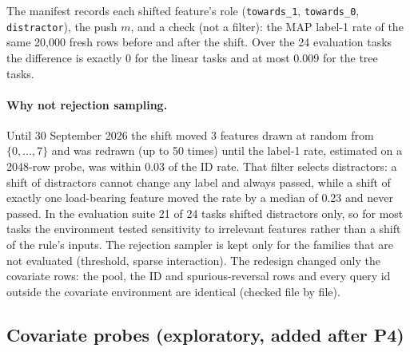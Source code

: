 \documentclass[11pt,a4paper]{article}
\newcommand{\1}{\mathbf{1}}
\theoremstyle{plain}
\theoremstyle{definition}
\theoremstyle{remark}
\begin{document}
The manifest records each shifted feature's role (\texttt{towards\_1},
\texttt{towards\_0}, \texttt{distractor}), the push $m$, and a check (not a
filter): the MAP label-1 rate of the same 20{,}000 fresh rows before and
after the shift. Over the 24 evaluation tasks the difference is exactly 0
for the linear tasks and at most 0.009 for the tree tasks.

\paragraph{Why not rejection sampling.} Until 30 September 2026 the shift
moved 3 features drawn at random from $\{0,\ldots,7\}$ and was redrawn (up
to 50 times) until the label-1 rate, estimated on a 2048-row probe, was
within 0.03 of the ID rate. That filter selects distractors: a shift of
distractors cannot change any label and always passed, while a shift of
exactly one load-bearing feature moved the rate by a median of 0.23 and
never passed. In the evaluation suite 21 of 24 tasks shifted distractors
only, so for most tasks the environment tested sensitivity to irrelevant
features rather than a shift of the rule's inputs. The rejection sampler is
kept only for the families that are not evaluated (threshold, sparse
interaction). The redesign changed only the covariate rows: the pool, the
ID and spurious-reversal rows and every query id outside the covariate
environment are identical (checked file by file).


\subsection{Covariate probes (exploratory, added after P4)}
\label{sec:covariate-probes}
\end{document}
